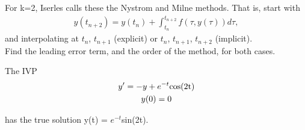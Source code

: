 \documentclass{jhwhw}
\begin{document}
\problem{}

    For k=2, Iserles calls these the Nystrom and Milne methods. That is, start with
    \begin{gather}
	    y(t_{n+2}) = y(t_n) + \int_{t_n}^{t_{n+2}}f(\tau , y(\tau )) d\tau ,
    \end{gather}
    and interpolating at $t_n$, $t_{n+1}$ (explicit) or $t_n$, $t_{n+1}$, $t_{n+2}$ (implicit). \\
    Find the leading error term, and the order of the method, for both cases.

\solution

\problem{}

The IVP \\
\begin{gather}
    y' = -y + e^{-t}$cos(2t)$\\
    y(0) = 0
\end{gather}

has the true solution y(t) = $e^{-t}$sin(2t).

\solution
\end{document}
